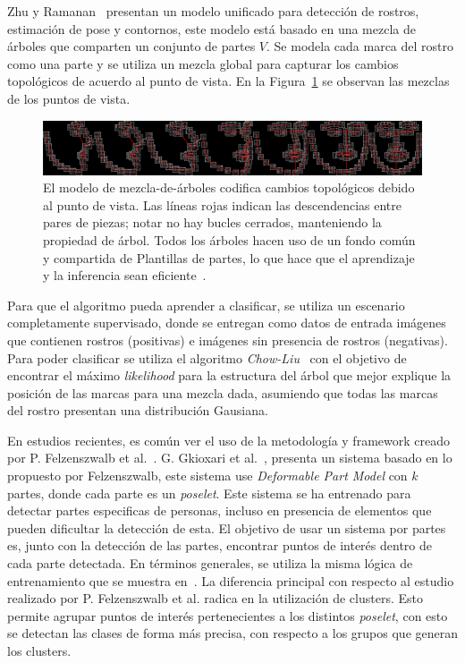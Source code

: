 Zhu y Ramanan~\cite{Zhu2012} presentan un modelo unificado para detección de rostros, estimación de pose y contornos, este modelo está basado en una mezcla de árboles que comparten un conjunto de partes $V$. Se modela cada marca del rostro como una parte y se utiliza un mezcla global para capturar los cambios topológicos de acuerdo al punto de vista. En la Figura~\ref{fig:m-view} se observan las mezclas de los puntos de vista.

\begin{figure}[tb]
 \centering
  \includegraphics[width=1\textwidth]{Figuras/viewpoints.jpg}
  \caption[Puntos de vista de un rostro]{El modelo de mezcla-de-árboles codifica cambios topológicos debido al punto de vista. Las líneas rojas indican las descendencias entre pares de piezas; notar no hay bucles cerrados, manteniendo la propiedad de árbol. Todos los árboles hacen uso de un fondo común y compartida de Plantillas de partes, lo que hace que el aprendizaje y la inferencia sean eficiente~\cite{Zhu2012}.}
  \label{fig:m-view}
\end{figure}

Para que el algoritmo pueda aprender a clasificar, se utiliza un escenario completamente supervisado, donde se entregan como datos de entrada imágenes que contienen rostros (positivas) e imágenes sin presencia de rostros (negativas). Para poder clasificar se utiliza el algoritmo \textit{Chow-Liu}~\cite{Chow1968} con el objetivo de encontrar el máximo \textit{likelihood} para la estructura del árbol que mejor explique la posición de las marcas para una mezcla dada, asumiendo que todas las marcas del rostro presentan una distribución Gausiana.

En estudios recientes, es común ver el uso de la metodología y framework creado por P. Felzenszwalb et al.~\cite{Felzenszwalb2010}. G. Gkioxari et al.~\cite{kposelets2014}, presenta un sistema basado en lo propuesto por Felzenszwalb, este sistema use \textit{Deformable Part Model} con $k$ partes, donde cada parte es un \textit{poselet}. Este sistema se ha entrenado para detectar partes especificas de personas, incluso en presencia de elementos que pueden dificultar la detección de esta. El objetivo de usar un sistema por partes es, junto con la detección de las partes, encontrar puntos de interés dentro de cada parte detectada. En términos generales, se utiliza la misma lógica de entrenamiento que se muestra en~\cite{Felzenszwalb2010}. La diferencia principal con respecto al estudio realizado por P. Felzenszwalb et al. radica en la utilización de clusters. Esto permite agrupar puntos de interés pertenecientes a los distintos \textit{poselet}, con esto se detectan las clases de forma más precisa, con respecto a los grupos que generan los clusters.

